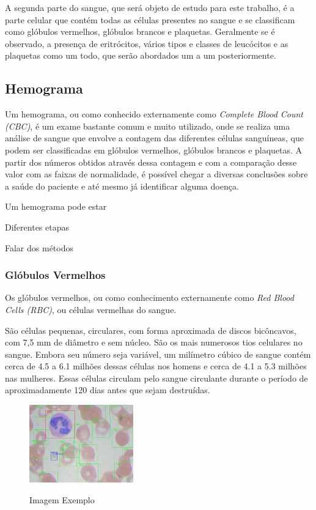 A segunda parte do sangue, que será objeto de estudo para este trabalho, é a parte celular que contém todas as células presentes no sangue e se classificam como glóbulos vermelhos, glóbulos brancos e plaquetas. Geralmente se é observado, a presença de eritrócitos, vários tipos e classes de leucócitos e as plaquetas como um todo, que serão abordados um a um posteriormente.

\subsection{Hemograma}
Um hemograma, ou como conhecido externamente como \emph{Complete Blood Count (CBC)}, é um exame bastante comum e muito utilizado, onde se realiza uma análise de sangue que envolve a contagem das diferentes células sanguíneas, que podem ser classificadas em glóbulos vermelhos, glóbulos brancos e plaquetas. A partir dos números obtidos através dessa contagem e com a comparação desse valor com as faixas de normalidade, é possível chegar a diversas conclusões sobre a saúde do paciente e até mesmo já identificar alguma doença.

Um hemograma pode estar 

Diferentes etapas

Falar dos métodos

\subsubsection{Glóbulos Vermelhos}
Os glóbulos vermelhos, ou como conhecimento externamente como \emph{Red Blood Cells (RBC)}, ou células vermelhas do sangue.

São células pequenas, circulares, com forma aproximada de discos bicôncavos, com 
7,5 mm de diâmetro e sem núcleo. São os mais numerosos tios celulares no sangue. Embora 
seu número seja variável, um milímetro cúbico de sangue contém cerca de 4.5 a 6.1
milhões dessas células nos homens e cerca de 4.1 a 5.3 milhões nas mulheres. Essas células 
circulam pelo sangue circulante durante o período de aproximadamente 120 dias antes que 
sejam destruídas.

\begin{figure}[!htb]
    \centering
    \caption{Imagem Exemplo}
    \includegraphics[width=0.40\textwidth]{img/example.jpg}
    \label{fig:exemplo1}
 \end{figure}
 
